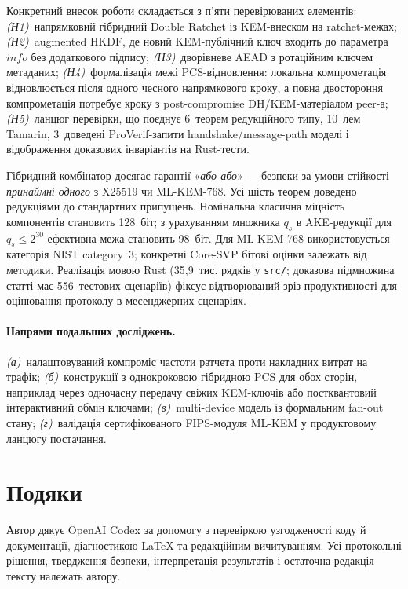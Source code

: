 \documentclass[11pt,a4paper]{article}
\theoremstyle{definition}
\begin{document}
Конкретний внесок роботи складається з п'яти перевірюваних елементів:
\emph{(Н1)}~напрямковий гібридний Double Ratchet із KEM-внеском на
ratchet-межах; \emph{(Н2)}~augmented HKDF, де новий KEM-публічний ключ
входить до параметра $\mathit{info}$ без додаткового підпису;
\emph{(Н3)}~дворівневе AEAD з ротаційним ключем метаданих;
\emph{(Н4)}~формалізація межі PCS-відновлення: локальна компрометація
відновлюється після одного чесного напрямкового кроку, а повна
двостороння компрометація потребує кроку з post-compromise DH/KEM-матеріалом
peer-а;
\emph{(Н5)}~ланцюг перевірки, що поєднує 6~теорем редукційного типу,
10~лем Tamarin, 3~доведені ProVerif-запити handshake/message-path моделі і відображення доказових
інваріантів на Rust-тести.

Гібридний комбінатор досягає гарантії «\emph{або-або}» — безпеки за
умови стійкості \emph{принаймні одного} з X25519 чи ML-KEM-768. Усі
шість теорем доведено редукціями до стандартних припущень. Номінальна
класична міцність компонентів становить 128~біт; з урахуванням
множника $q_s$ в AKE-редукції для $q_s\le 2^{30}$ ефективна межа
становить 98~біт. Для ML-KEM-768 використовується категорія
NIST category~3; конкретні Core-SVP бітові оцінки залежать від методики.
Реалізація мовою Rust
(35{,}9~тис. рядків у \texttt{src/}; доказова підмножина статті має
556~тестових сценаріїв) фіксує відтворюваний зріз продуктивності для
оцінювання протоколу в месенджерних сценаріях.

\paragraph{Напрями подальших досліджень.}
\emph{(а)}~налаштовуваний компроміс частоти ратчета проти
накладних витрат на трафік; \emph{(б)}~конструкції з однокроковою
гібридною PCS для обох сторін, наприклад через одночасну передачу
свіжих KEM-ключів або постквантовий інтерактивний обмін ключами;
\emph{(в)}~multi-device модель із формальним fan-out стану;
\emph{(г)}~валідація сертифікованого FIPS-модуля ML-KEM у продуктовому
ланцюгу постачання.

\section*{Подяки}

Автор дякує OpenAI Codex за допомогу з перевіркою узгодженості коду й
документації, діагностикою LaTeX та редакційним вичитуванням. Усі
протокольні рішення, твердження безпеки, інтерпретація результатів і
остаточна редакція тексту належать автору.
\end{document}
